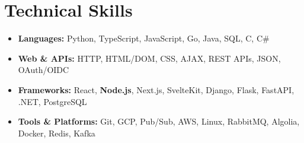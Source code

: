\documentclass[letterpaper,11pt]{article}
\newcommand{\resumeItem}[1]{
  \item{
    {#1}
  }
}
\newcommand{\resumeItemThin}[1]{
  \item{
    {#1 \vspace{-5pt}}
  }
}
\newcommand{\resumeItemListStart}{\vspace{3pt}\begin{itemize}[leftmargin=0.15in, rightmargin=0.15in]}
\newcommand{\resumeItemListEnd}{\end{itemize}\vspace{-5pt}}
\begin{document}


\section{Technical Skills}
\resumeItemListStart
\resumeItemThin{\textbf{Languages: }{Python, TypeScript, JavaScript, Go, Java, SQL, C, C\#}}\\
\resumeItemThin{\textbf{Web \& APIs: } HTTP, HTML/DOM, CSS, AJAX, REST APIs, JSON, OAuth/OIDC}\\
\resumeItemThin{\textbf{Frameworks: } React, \textbf{Node.js}, Next.js, SvelteKit, Django, Flask, FastAPI, .NET, PostgreSQL}\\
\resumeItemThin{\textbf{Tools \& Platforms: }{Git, GCP, Pub/Sub, AWS, Linux, RabbitMQ, Algolia, Docker, Redis, Kafka}}\\
\resumeItemListEnd
\end{document}
